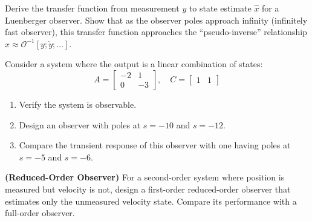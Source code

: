 \begin{exercise}
Derive the transfer function from measurement $y$ to state estimate $\hat{x}$ for a Luenberger observer. Show that as the observer poles approach infinity (infinitely fast observer), this transfer function approaches the ``pseudo-inverse'' relationship $\hat{x} \approx \mathcal{O}^{-1}[y; \dot{y}; \ldots]$.
\end{exercise}

\begin{exercise}
Consider a system where the output is a linear combination of states:
\begin{equation}
A = \begin{bmatrix} -2 & 1 \\ 0 & -3 \end{bmatrix}, \quad
C = \begin{bmatrix} 1 & 1 \end{bmatrix}
\end{equation}
\begin{enumerate}
    \item[(a)] Verify the system is observable.
    \item[(b)] Design an observer with poles at $s = -10$ and $s = -12$.
    \item[(c)] Compare the transient response of this observer with one having poles at $s = -5$ and $s = -6$.
\end{enumerate}
\end{exercise}

\begin{exercise}
\textbf{(Reduced-Order Observer)} For a second-order system where position is measured but velocity is not, design a first-order reduced-order observer that estimates only the unmeasured velocity state. Compare its performance with a full-order observer.
\end{exercise}

